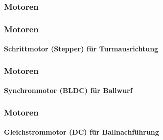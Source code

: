 \subsubsection{Motoren}
\begin{frame}
	\frametitle{Motoren\hfill{}\footnotesize \group}
	\framesubtitle{Schrittmotor (Stepper) für Turmausrichtung}
\end{frame}

\begin{frame}
	\frametitle{Motoren\hfill{}\footnotesize \group}
	\framesubtitle{Synchronmotor (BLDC) für Ballwurf}
\end{frame}

\begin{frame}
	\frametitle{Motoren\hfill{}\footnotesize \group}
	\framesubtitle{Gleichstrommotor (DC) für Ballnachführung}
\end{frame}

